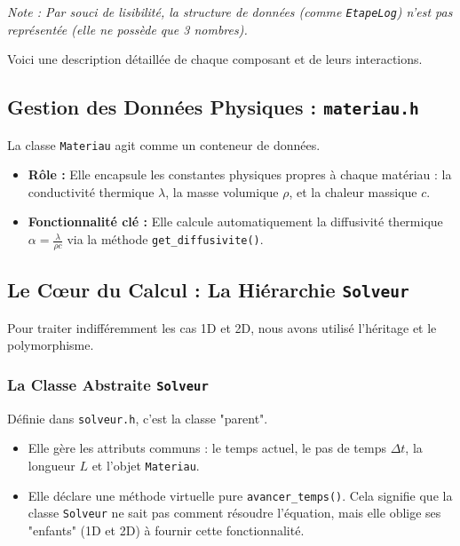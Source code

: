 \documentclass[a4paper,12pt]{article}
\begin{document}
\textit{Note : Par souci de lisibilité, la structure de données (comme \texttt{EtapeLog}) n'est pas représentée (elle ne possède que 3 nombres).}













Voici une description détaillée de chaque composant et de leurs interactions.





















\subsection{Gestion des Données Physiques : \texttt{materiau.h}}
La classe \texttt{Materiau} agit comme un conteneur de données.

\begin{itemize}
    \item \textbf{Rôle :} Elle encapsule les constantes physiques propres à chaque matériau : la conductivité thermique $\lambda$, la masse volumique $\rho$, et la chaleur massique $c$.
    \item \textbf{Fonctionnalité clé :} Elle calcule automatiquement la diffusivité thermique $\alpha = \frac{\lambda}{\rho c}$ via la méthode \texttt{get\_diffusivite()}.
    
\end{itemize}

\subsection{Le Cœur du Calcul : La Hiérarchie \texttt{Solveur}}
Pour traiter indifféremment les cas 1D et 2D, nous avons utilisé l'héritage et le polymorphisme.


\subsubsection{La Classe Abstraite \texttt{Solveur}}
Définie dans \texttt{solveur.h}, c'est la classe "parent".
\begin{itemize}
    \item Elle gère les attributs communs : le temps actuel, le pas de temps $\Delta t$, la longueur $L$ et l'objet \texttt{Materiau}.
    \item Elle déclare une méthode virtuelle pure \texttt{avancer\_temps()}. Cela signifie que la classe \texttt{Solveur} ne sait pas comment résoudre l'équation, mais elle oblige ses "enfants" (1D et 2D) à fournir cette fonctionnalité.
\end{itemize}
\end{document}
